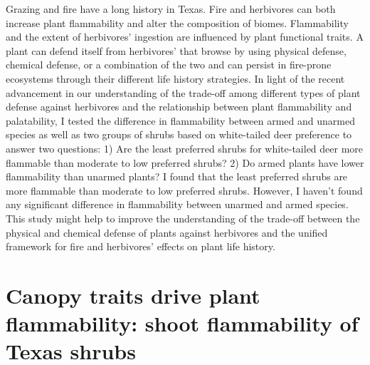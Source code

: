 \documentclass{ttuthes2007}
\begin{document}
Grazing and fire have a long history in Texas. Fire and herbivores can both increase plant flammability and alter the composition of biomes. Flammability and the extent of herbivores' ingestion are influenced by plant functional traits. A plant can defend itself from herbivores' that browse by using physical defense, chemical defense, or a combination of the two and can persist in fire-prone ecosystems through their different life history strategies. In light of the recent advancement in our understanding of the trade-off among different types of plant defense against herbivores and the relationship between plant flammability and palatability, I tested the difference in flammability between armed and unarmed species as well as two groups of shrubs based on white-tailed deer preference to answer two questions: 1) Are the least preferred shrubs for white-tailed deer more flammable than moderate to low preferred shrubs? 2) Do armed plants have lower flammability than unarmed plants? I found that the least preferred shrubs are more flammable than moderate to low preferred shrubs. However, I haven't found any significant difference in flammability between
unarmed and armed species. This study might help to improve the understanding of the trade-off between the physical and chemical defense of plants against herbivores and the unified framework for fire and herbivores' effects on plant life history. 



\listoftables
\listoffigures

\mainmatter



\chapter{\textbf{Canopy traits drive plant flammability: shoot flammability of Texas shrubs}}
\end{document}
